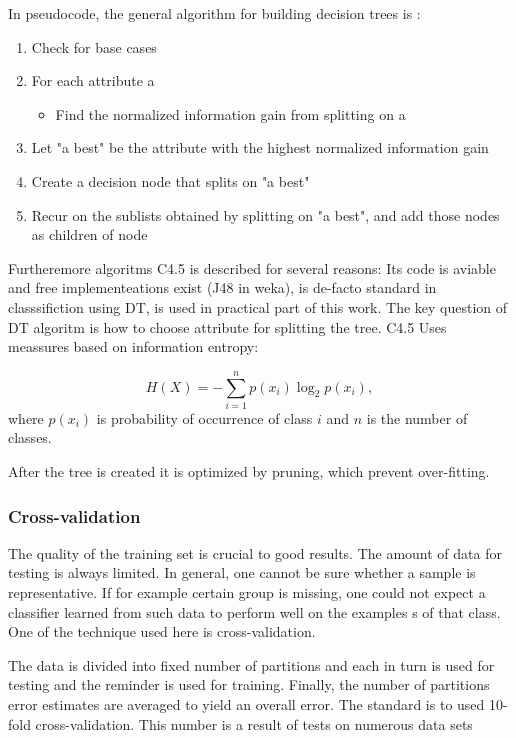 In pseudocode, the general algorithm for building decision trees is
\cite{kotsiantis2007supervised}:
\begin{enumerate}
\item Check for base cases
\item For each attribute a
  \begin{itemize}
  \item Find the normalized information gain from splitting on a
  \end{itemize}
\item Let "a best" be the attribute with the highest normalized information gain
\item Create a decision node that splits on "a best"
\item Recur on the sublists obtained by splitting on "a best", and add
  those nodes as children of node
\end{enumerate}

Furtheremore algoritms C4.5 is described for several reasons: Its code
is aviable and free implementeations exist (J48 in weka), is de-facto
standard in classsifiction using DT, is used in practical part of this
work. The key question of DT algoritm is how to choose attribute for
splitting the tree. C4.5 Uses meassures based on information entropy:

\begin{equation}
  \label{eq:entropy}
  H(X) = -\sum_{i=1}^n {p(x_i) \log_2 p(x_i)},
\end{equation}
where $p(x_i)$ is probability of occurrence of class $i$ and $n$ is the
number of classes.

After the tree is created it is optimized by pruning, which prevent
over-fitting.

\subsubsection{Cross-validation}
The quality of the training set is crucial to good results. The amount
of data for testing is always limited. In general, one cannot be sure
whether a sample is representative. If for example certain group is
missing, one could not expect a classifier learned from such data to
perform well on the examples s of that class. One of the technique used
here is cross-validation.

The data is divided into fixed number of partitions and each in turn
is used for testing and the reminder is used for training. Finally,
the number of partitions error estimates are averaged to yield an
overall error. The standard is to used 10-fold cross-validation. This
number is a result of tests on numerous data sets \cite{witten2005data}

